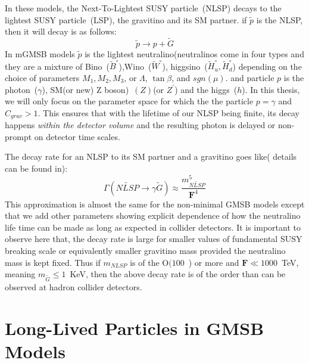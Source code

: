 {\begin{itemize}
\end{itemize}

In these models, the Next-To-Lightest SUSY particle~(NLSP) decays to the lightest SUSY particle~(LSP), the gravitino and its SM partner. if $\tilde{p}$ is the NLSP, then it will decay is as follows:
\begin{equation}
\tilde{p}\rightarrow p + \tilde{G}
\end{equation}
In mGMSB models $\tilde{p}$ is the lightest neutralino(neutralinos come in four types and they are a mixture of Bino~($\tilde{B}^{\circ}$),Wino~($\tilde{W}^{\circ}$),
higgsino~($\tilde{H}^{\circ}_{u},\tilde{H}^{\circ}_{d}$) depending on the choice of parameters $M_{1},M_{2},M_{3}$, or $\Lambda$, $\tan\beta$, and $sgn(\mu)$.
and particle $p$ is the photon~($\gamma$),  SM(or new) Z boson)~$(Z)$(or $Z^{\prime}$) and the higgs~($h$).
In this thesis, we will only focus on the parameter space for which the the particle $p = \gamma$ and $C_{grav} > 1$.
This ensures that with the lifetime of our NLSP being finite, its decay happens \textit{within the detector volume} and the resulting photon is delayed or non-prompt on detector time scales.

The decay rate for an NLSP to its SM partner and a gravitino goes like( details can be found in\cite{SM,GU}):
\begin{equation}\label{drate}
\Gamma(\tilde{NLSP} \rightarrow \gamma\tilde{G}) \approx  \frac{m^{5}_{\tilde{NLSP}}}{\mathbf{F}^{4}}
\end{equation}
This approximation is almost the same for the non-minimal GMSB models except that we add other parameters showing explicit dependence of how the neutralino life time can be made as long as expected in collider detectors.
It is important to observe here that, the decay rate is large for smaller values of fundamental SUSY breaking scale or equivalently smaller gravitino mass provided the neutralino mass is kept fixed. Thus if $m_{NLSP}$ is of the $\mathrm{O}(100$~\GeV) or more and $\mathbf{F} \ll 1000$~TeV, meaning $m_{\tilde{G}} \leq 1$~KeV, then the above decay rate is of the order than can be observed at hadron collider detectors.




\section{Long-Lived Particles in GMSB Models}
}
